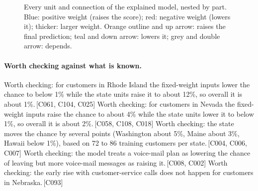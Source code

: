 \documentclass[a4paper,10pt]{article}
\newif\ifreviewmarks
\newcommand{\reviewrule}{\noindent{\color{BrickRed}\rule{\linewidth}{0.8pt}}}
\newenvironment{drafted}[1][]{%
  \ifreviewmarks\par\addvspace{\medskipamount}\reviewrule\par\nopagebreak
  \noindent{\color{BrickRed}\sffamily\footnotesize\textbf{Thesis Draft}\quad #1\hfill review}\par\nopagebreak\smallskip\fi}{%
  \ifreviewmarks\par\smallskip\noindent{\color{BrickRed}\sffamily\footnotesize end of thesis draft}\par\nopagebreak\reviewrule\par\medskip\fi}
\begin{document}
\begin{drafted}[plain-language layer: churn100-s4-c3]
\begin{landscape}
\begin{figure}[p]
{}%
\caption{Every unit and connection of the explained model, nested by part. Blue: positive weight (raises the score); red: negative weight (lowers it); thicker: larger weight. Orange outline and up arrow: raises the final prediction; teal and down arrow: lowers it; grey and double arrow: depends.}
\label{fig:churn100s4c3:overview}
\end{figure}
\end{landscape}
\paragraph{Worth checking against what is known.} Worth checking: for customers in Rhode Island the fixed-weight inputs lower the chance to below 1\% while the state units raise it to about 12\%, so overall it is about 1\%.\,{\scriptsize\textcolor{NavyBlue}{[C061, C104, C025]}} Worth checking: for customers in Nevada the fixed-weight inputs raise the chance to about 4\% while the state units lower it to below 1\%, so overall it is about 2\%.\,{\scriptsize\textcolor{NavyBlue}{[C058, C108, C018]}} Worth checking: the state moves the chance by several points (Washington about 5\%, Maine about 3\%, Hawaii below 1\%), based on 72 to 86 training customers per state.\,{\scriptsize\textcolor{NavyBlue}{[C004, C006, C007]}} Worth checking: the model treats a voice-mail plan as lowering the chance of leaving but more voice-mail messages as raising it.\,{\scriptsize\textcolor{NavyBlue}{[C008, C002]}} Worth checking: the early rise with customer-service calls does not happen for customers in Nebraska.\,{\scriptsize\textcolor{NavyBlue}{[C093]}}

\end{drafted}
\end{document}
